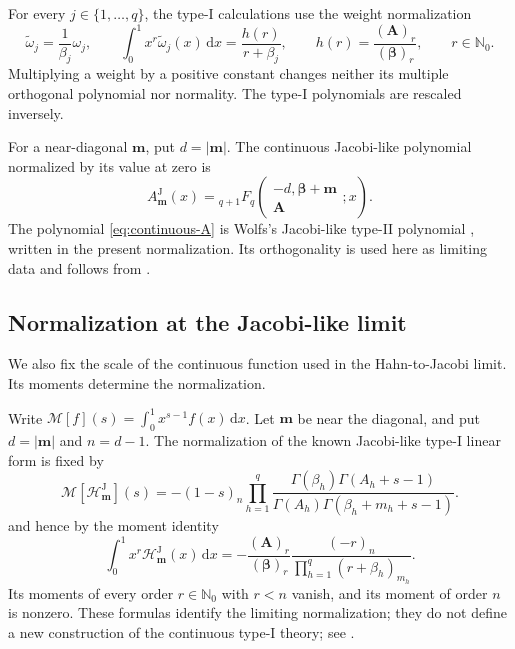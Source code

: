 \documentclass[10pt]{amsart}
\newcommand{\Nzero}{\mathbb N_0}
\newcommand{\dd}{\,\mathrm d}
\newcommand{\A}{\boldsymbol A}
\newcommand{\bbeta}{\boldsymbol\beta}
\newcommand{\mm}{\boldsymbol m}
\newcommand{\abs}[1]{\lvert#1\rvert}
\newcommand{\pFq}[5]{{}_{#1}F_{#2}\!\left(\begin{matrix}#3\\#4\end{matrix};#5\right)}
\theoremstyle{plain}
\theoremstyle{definition}
\theoremstyle{remark}
\begin{document}
For every \(j\in\{1,\ldots,q\}\), the type-I calculations use the weight
normalization
\begin{equation}
 \widetilde\omega_j=\frac{1}{\beta_j}\omega_j,
 \qquad
 \int_0^1x^r\widetilde\omega_j(x)\dd x
 =\frac{h(r)}{r+\beta_j},
 \qquad
 h(r)=\frac{(\A)_r}{(\bbeta)_r},\qquad r\in\Nzero.
 \label{eq:canonical-continuous-rows}
\end{equation}
Multiplying a weight by a positive constant changes neither its multiple
orthogonal polynomial nor normality. The type-I polynomials are rescaled
inversely.

For a near-diagonal \(\mm\), put \(d=\abs\mm\). The continuous
Jacobi-like polynomial normalized by its value at zero is
\begin{equation}
A^{\mathrm J}_{\mm}(x)
 =\pFq{q+1}{q}{-d,\bbeta+\mm}{\A}{x}.
 \label{eq:continuous-A}
\end{equation}
The polynomial \eqref{eq:continuous-A} is Wolfs's Jacobi-like type-II polynomial
\cite[Theorem~2.13]{Wolfs2024}, written in the present normalization.
Its orthogonality is used here as limiting data and follows from
\cite[Theorem~2.13]{Wolfs2024}.

\subsection{Normalization at the Jacobi-like limit}

We also fix the scale of the continuous function used in the
Hahn-to-Jacobi limit. Its moments determine the normalization.

Write \(\mathcal M[f](s)=\int_0^1x^{s-1}f(x)\dd x\).
Let \(\mm\) be near the diagonal, and put \(d=\abs\mm\) and \(n=d-1\).
The normalization of the known Jacobi-like type-I linear form is fixed by
\begin{equation}
 \mathcal M[\mathcal H^{\mathrm J}_{\mm}](s)
 =-(1-s)_n\prod_{h=1}^q
 \frac{\Gamma(\beta_h)\Gamma(A_h+s-1)}
 {\Gamma(A_h)\Gamma(\beta_h+m_h+s-1)}.
 \label{eq:Jacobi-B-Mellin}
\end{equation}
and hence by the moment identity
\begin{equation}
 \int_0^1x^r\mathcal H^{\mathrm J}_{\mm}(x)\dd x
 =-\frac{(\A)_r}{(\bbeta)_r}
 \frac{(-r)_n}{\prod_{h=1}^q(r+\beta_h)_{m_h}}.
 \label{eq:Jacobi-B-moments}
\end{equation}
Its moments of every order \(r\in\Nzero\) with \(r<n\) vanish, and its moment of order
\(n\) is nonzero. These formulas identify the limiting normalization; they
do not define a new
construction of the continuous type-I theory; see
\cite[Theorem~2.6 and Corollary~2.8]{Wolfs2024}.
\end{document}
